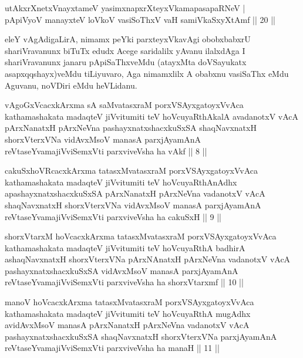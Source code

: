 
\begin{shl}
utAkxrXnetxV\s nayxtameV yasimxnapxrXteyxVkamapasapaRNeV | \\
pApiVyoV manayxteV loVkoV vasiSoThxV vaH samiVkaSxyXtAmf \hfill|| 20 || 
\end{shl}

\begin{artha}
eleY vAgAdigaLirA, nimamx peYki parxteyxVkavAgi obobxbabxrU 
shariVravanunx biTuTx edudx Acege saridalilx yAvanu ilalxdAga I shariVravanunx janaru 
pApiSaThxveMdu (atayxMta doVSayukatx asapxqqshayx)veMdu tiLiyuvaro, 
Aga nimamxlilx A obabxnu vasiSaThx eMdu Aguvanu, noVDiri eMdu 
heVLidanu.
\end{artha}

\begin{kandikeshl}
vAgoGxVcacxkArxma sA saMvatasxraM porxVSAyxgatoyxVvAca kathamashakata madaqteV jiVvitumiti teV hoVcuyaRthAkalA avadanotxV vAcA pArxNanatxH pArxNeVna pashayxnatxshacxkuSxSA shaqNavxnatxH shorxVterxVNa vidAvxMsoV manasA parxjAyamAnA reVtaseYvamajiVviSemxVti parxviveVsha ha vAkf || 8 ||
\end{kandikeshl}

\begin{kandikeshl}
cakuSxhoVRcacxkArxma tatasxMvatasxraM porxVSAyxgatoyxVvAca kathamashakata madaqteV jiVvitumiti teV hoVcuyaRthAnAdhx apashayxnatxshacxkuSxSA pArxNanatxH pArxNeVna vadanotxV vAcA shaqNavxnatxH shorxVterxVNa vidAvxMsoV manasA parxjAyamAnA reVtaseYvamajiVviSemxVti parxviveVsha ha cakuSxH || 9 ||
\end{kandikeshl}

\begin{kandikeshl}
shorxVtarxM hoVcacxkArxma tatasxMvatasxraM porxVSAyxgatoyxVvAca kathamashakata madaqteV jiVvitumiti teV hoVcuyaRthA badhirA ashaqNavxnatxH shorxVterxVNa pArxNAnatxH pArxNeVna vadanotxV vAcA pashayxnatxshacxkuSxSA vidAvxMsoV manasA parxjAyamAnA reVtaseYvamajiVviSemxVti parxviveVsha ha shorxVtarxmf || 10 ||
\end{kandikeshl}

\begin{kandikeshl}
manoV hoVcacxkArxma tatasxMvatasxraM porxVSAyxgatoyxVvAca kathamashakata madaqteV jiVvitumiti teV hoVcuyaRthA mugAdhx avidAvxMsoV manasA pArxNanatxH pArxNeVna vadanotxV vAcA pashayxnatxshacxkuSxSA shaqNavxnatxH shorxVterxVNa parxjAyamAnA reVtaseYvamajiVviSemxVti parxviveVsha ha manaH || 11 ||
\end{kandikeshl}

